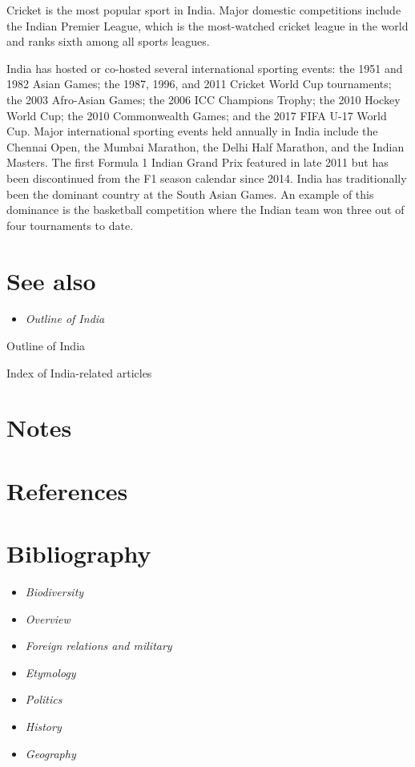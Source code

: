 Cricket is the most popular sport in India. Major domestic competitions
include the Indian Premier League, which is the most-watched cricket
league in the world and ranks sixth among all sports leagues.

India has hosted or co-hosted several international sporting events: the
1951 and 1982 Asian Games; the 1987, 1996, and 2011 Cricket World Cup
tournaments; the 2003 Afro-Asian Games; the 2006 ICC Champions Trophy;
the 2010 Hockey World Cup; the 2010 Commonwealth Games; and the 2017
FIFA U-17 World Cup. Major international sporting events held annually
in India include the Chennai Open, the Mumbai Marathon, the Delhi Half
Marathon, and the Indian Masters. The first Formula 1 Indian Grand Prix
featured in late 2011 but has been discontinued from the F1 season
calendar since 2014. India has traditionally been the dominant country
at the South Asian Games. An example of this dominance is the basketball
competition where the Indian team won three out of four tournaments to
date.

\section{See also}\label{see-also}

\begin{itemize}
\item
  \emph{Outline of India}
\end{itemize}

Outline of India

Index of India-related articles

\section{Notes}\label{notes}

\section{References}\label{references}

\section{Bibliography}\label{bibliography}

\begin{itemize}
\item
  \emph{Biodiversity}
\item
  \emph{Overview}
\item
  \emph{Foreign relations and military}
\item
  \emph{Etymology}
\item
  \emph{Politics}
\item
  \emph{History}
\item
  \emph{Geography}
\end{itemize}

